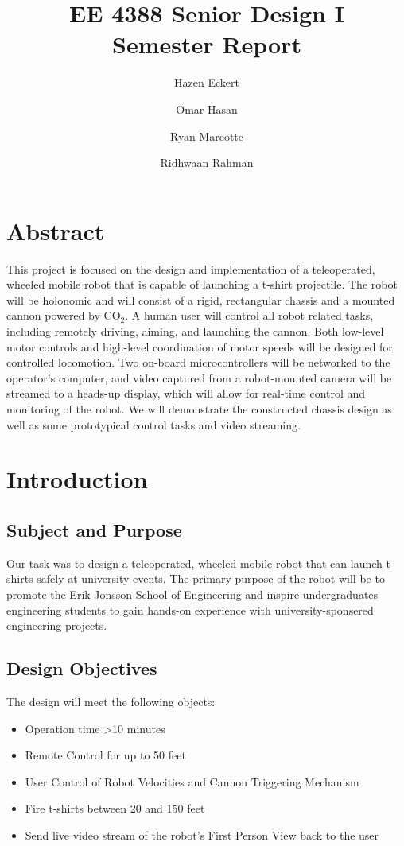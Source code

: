 \documentclass[letterpaper,12pt]{article}
\begin{document}
\title{EE 4388 Senior Design I\\Semester Report}
\author{Hazen Eckert \and Omar Hasan \and Ryan Marcotte \and Ridhwaan Rahman}
\maketitle
\tableofcontents
\newpage

\section{Abstract}
\noindent This project is focused on the design and implementation of a teleoperated, wheeled mobile robot that is capable of launching a t-shirt projectile. The robot will be holonomic and will consist of a rigid, rectangular chassis and a mounted cannon powered by $\textrm{CO}_2$. A human user will control all robot related tasks, including remotely driving, aiming, and launching the cannon. Both low-level motor controls and high-level coordination of motor speeds will be designed for controlled locomotion. Two on-board microcontrollers will be networked to the operator's computer, and video captured from a robot-mounted camera will be streamed to a heads-up display, which will allow for real-time control and monitoring of the robot. We will demonstrate the constructed chassis design as well as some prototypical control tasks and video streaming.

\section{Introduction}

\subsection{Subject and Purpose}
\noindent Our task was to design a teleoperated, wheeled mobile robot that can launch t-shirts safely at university events. The primary purpose of the robot will be to promote the Erik Jonsson School of Engineering and inspire undergraduates engineering students to gain hands-on experience with university-sponsered engineering projects.

\subsection{Design Objectives}
\noindent The design will meet the following objects:
\begin{itemize}
    \item Operation time \textgreater 10 minutes
    \item Remote Control for up to 50 feet
    \item User Control of Robot Velocities and Cannon Triggering Mechanism
    \item Fire t-shirts between 20 and 150 feet
    \item Send live video stream of the robot's First Person View back to the user
\end{itemize}
\end{document}
